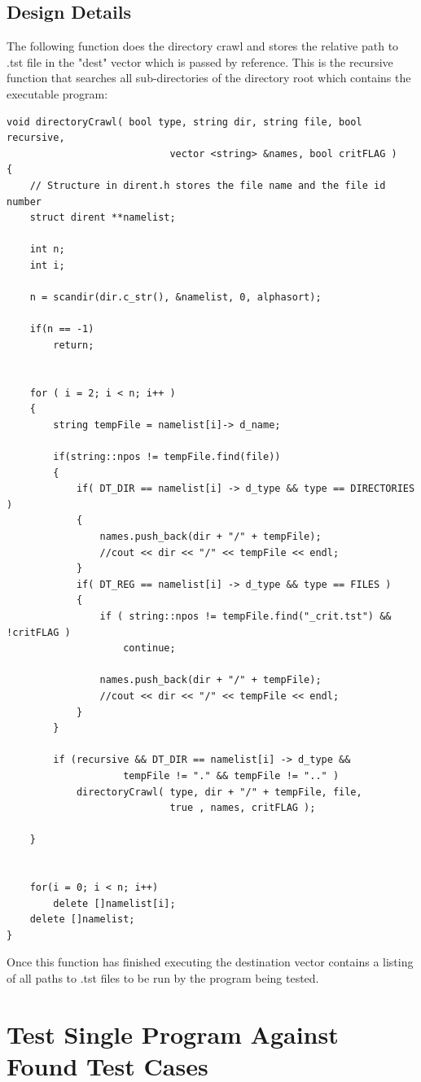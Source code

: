 \subsection{Design Details}
The following function does the directory crawl and stores the relative path to 
 .tst file in the "dest" vector which is passed by reference. This is the recursive function that searches all sub-directories of the directory root which contains the executable program:
\begin{lstlisting}
void directoryCrawl( bool type, string dir, string file, bool recursive, 
							vector <string> &names, bool critFLAG )
{
    // Structure in dirent.h stores the file name and the file id number
    struct dirent **namelist;

    int n;
    int i;

    n = scandir(dir.c_str(), &namelist, 0, alphasort);

    if(n == -1)
        return;


    for ( i = 2; i < n; i++ )
    {
        string tempFile = namelist[i]-> d_name;

        if(string::npos != tempFile.find(file))
        {
            if( DT_DIR == namelist[i] -> d_type && type == DIRECTORIES )
            {
                names.push_back(dir + "/" + tempFile);
                //cout << dir << "/" << tempFile << endl;
            }
            if( DT_REG == namelist[i] -> d_type && type == FILES )
            {
                if ( string::npos != tempFile.find("_crit.tst") && !critFLAG )
                    continue;

                names.push_back(dir + "/" + tempFile);
                //cout << dir << "/" << tempFile << endl;
            }
        }

        if (recursive && DT_DIR == namelist[i] -> d_type && 
        			tempFile != "." && tempFile != ".." )
            directoryCrawl( type, dir + "/" + tempFile, file, 
            				true , names, critFLAG );

    }


    for(i = 0; i < n; i++)
        delete []namelist[i];
    delete []namelist;
}
\end{lstlisting}
Once this function has finished executing the destination vector contains a listing of all paths to .tst files to be run by the program being tested.



\section{Test Single Program Against Found Test Cases}

